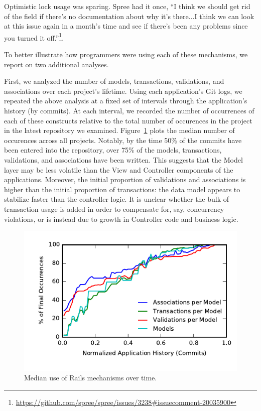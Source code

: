 Optimistic lock usage was sparing. Spree had it once, ``I think we
should get rid of the field if there's no documentation about why it's
there...I think we can look at this issue again in a month's time and
see if there's been any problems since you turned it
off.''\footnote{\url{https://github.com/spree/spree/issues/3238#issuecomment-20035900}}.

 To better illustrate how programmers
were using each of these mechanisms, we report on two additional
analyses.

First, we analyzed the number of models, transactions, validations,
and associations over each project's lifetime. Using each
application's Git logs, we repeated the above analysis at a fixed set
of intervals through the application's history (by commits). At each
interval, we recorded the number of occurrences of each of these
constructs relative to the total number of occurences in the project
in the latest repository we examined. Figure~\ref{fig:historical}
plots the median number of occurences across all projects. Notably, by
the time 50\% of the commits have been entered into the repository,
over 75\% of the models, transactions, validations, and associations
have been written. This suggests that the Model layer may be less
volatile than the View and Controller components of the
applications. Moreover, the initial proportion of validations and
associations is higher than the initial proportion of transactions:
the data model appears to stabilize faster than the controller
logic. It is unclear whether the bulk of transaction usage is added in
order to compensate for, say, concurrency violations, or is instead
due to growth in Controller code and business logic.

\begin{figure}
\includegraphics[width=\columnwidth]{figs/historical-median.pdf}\vspace{-2em}
\caption{Median use of Rails mechanisms over time.}
\label{fig:historical}
\end{figure}

